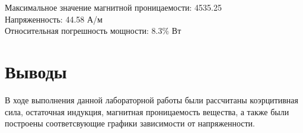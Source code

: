 \documentclass{article}%
\begin{document}
%
Максимальное значение магнитной проницаемости: 4535.25\\%
Напряженность: 44.58 А/м\\%
Относительная погрешность мощности: $8.3 \%$ Вт

%
\newpage%
\section{Выводы}%
\label{sec:}%
В ходе выполнения данной лабораторной работы были рассчитаны коэрцитивная сила, остаточная индукция, магнитная проницаемость вещества, а также были построены соответсвующие графики зависимости от напряженности.

%
\end{document}
